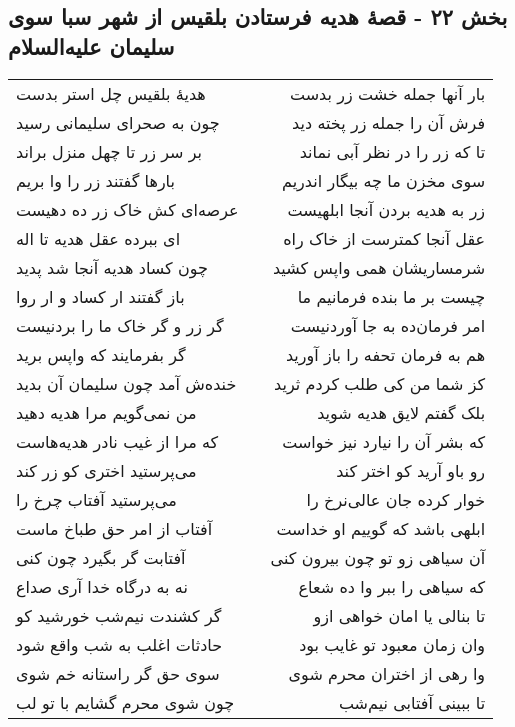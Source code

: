 \begin{center}
\section*{بخش ۲۲ - قصهٔ هدیه فرستادن بلقیس از شهر سبا  سوی سلیمان علیه‌السلام}
\label{sec:sh022}
\begin{longtable}{l p{0.5cm} r}
هدیهٔ بلقیس چل استر بدست
&&
بار آنها جمله خشت زر بدست
\\
چون به صحرای سلیمانی رسید
&&
فرش آن را جمله زر پخته دید
\\
بر سر زر تا چهل منزل براند
&&
تا که زر را در نظر آبی نماند
\\
بارها گفتند زر را وا بریم
&&
سوی مخزن ما چه بیگار اندریم
\\
عرصه‌ای کش خاک زر ده دهیست
&&
زر به هدیه بردن آنجا ابلهیست
\\
ای ببرده عقل هدیه تا اله
&&
عقل آنجا کمترست از خاک راه
\\
چون کساد هدیه آنجا شد پدید
&&
شرمساریشان همی واپس کشید
\\
باز گفتند ار کساد و ار روا
&&
چیست بر ما بنده فرمانیم ما
\\
گر زر و گر خاک ما را بردنیست
&&
امر فرمان‌ده به جا آوردنیست
\\
گر بفرمایند که واپس برید
&&
هم به فرمان تحفه را باز آورید
\\
خنده‌ش آمد چون سلیمان آن بدید
&&
کز شما من کی طلب کردم ثرید
\\
من نمی‌گویم مرا هدیه دهید
&&
بلک گفتم لایق هدیه شوید
\\
که مرا از غیب نادر هدیه‌هاست
&&
که بشر آن را نیارد نیز خواست
\\
می‌پرستید اختری کو زر کند
&&
رو باو آرید کو اختر کند
\\
می‌پرستید آفتاب چرخ را
&&
خوار کرده جان عالی‌نرخ را
\\
آفتاب از امر حق طباخ ماست
&&
ابلهی باشد که گوییم او خداست
\\
آفتابت گر بگیرد چون کنی
&&
آن سیاهی زو تو چون بیرون کنی
\\
نه به درگاه خدا آری صداع
&&
که سیاهی را ببر وا ده شعاع
\\
گر کشندت نیم‌شب خورشید کو
&&
تا بنالی یا امان خواهی ازو
\\
حادثات اغلب به شب واقع شود
&&
وان زمان معبود تو غایب بود
\\
سوی حق گر راستانه خم شوی
&&
وا رهی از اختران محرم شوی
\\
چون شوی محرم گشایم با تو لب
&&
تا ببینی آفتابی نیم‌شب
\\

\end{longtable}
\end{center}
